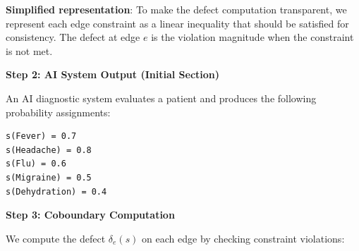 \documentclass[
]{article}
\begin{document}
\textbf{Simplified representation}: To make the defect computation
transparent, we represent each edge constraint as a linear inequality
that should be satisfied for consistency. The defect at edge \(e\) is
the violation magnitude when the constraint is not met.

\textbf{Step 2: AI System Output (Initial Section)}

An AI diagnostic system evaluates a patient and produces the following
probability assignments:

\begin{verbatim}
s(Fever) = 0.7
s(Headache) = 0.8
s(Flu) = 0.6
s(Migraine) = 0.5
s(Dehydration) = 0.4
\end{verbatim}

\textbf{Step 3: Coboundary Computation}

We compute the defect \(\delta_e(s)\) on each edge by checking
constraint violations:
\end{document}
